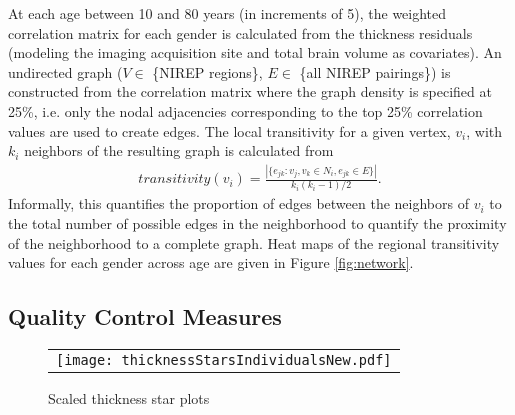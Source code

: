 At each age between 10 and 80 years (in increments of 5), the weighted correlation
matrix for each gender is calculated from the thickness residuals 
(modeling the imaging acquisition site and total brain volume as covariates).  An undirected graph ($V \in$ \{NIREP regions\}, $E \in$ \{all NIREP pairings\})
is constructed from the correlation matrix where the graph density is specified at 25\%, i.e. only the nodal adjacencies corresponding to the top 25\% correlation values are used to create edges.    The local transitivity for a given vertex, $v_i$, with $k_i$ neighbors of the resulting graph is calculated from
\begin{align}
  transitivity(v_i) = \frac{|\{e_{jk}: v_j, v_k \in N_i, e_{jk} \in E \}|}{k_i (k_i-1)/2}.
\end{align}
Informally, this quantifies the proportion of edges between the neighbors of $v_i$ to the total number of possible edges in the neighborhood to quantify the proximity of the neighborhood to a complete graph.  Heat maps of the regional transitivity values for each
gender across age are given in Figure \ref{fig:network}.  


\subsection{Quality Control Measures}
\begin{figure}
  \centering
  \begin{tabular}{c}
  \texttt{[image: thicknessStarsIndividualsNew.pdf]} 
  \end{tabular}
  \caption{Scaled thickness star plots
  }
  \label{fig:stars}
\end{figure}






